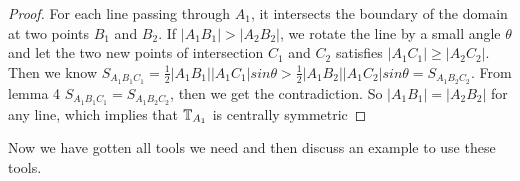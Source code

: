 \begin{proof}
	For each line passing through $A_1$, it intersects the boundary 
	of the domain at two points $B_1$ and $B_2$. If $|A_1B_1| > |A_2B_2|$, 
	we rotate the line  by  a small angle $\theta$ and let the two new 
	points of intersection $C_1$ and $C_2$ satisfies $|A_1C_1| \geq |A_2C_2|$. 
	Then we know  $S_{A_1B_1C_1} = \frac{1}{2}|A_1B_1||A_1C_1|sin\theta >  \frac{1}{2}|A_1B_2||A_1C_2|sin\theta = S_{A_1B_2C_2}$. From lemma 4
	$S_{A_1B_1C_1}=S_{A_1B_2C_2}$, then we get the 
	contradiction. So $|A_1B_1|=|A_2B_2|$ for any line, 
	which implies that $\mathbb{T}_{A_1}$ is centrally symmetric
\end{proof}

Now we have gotten all tools we need and then discuss an example
to use these tools.
